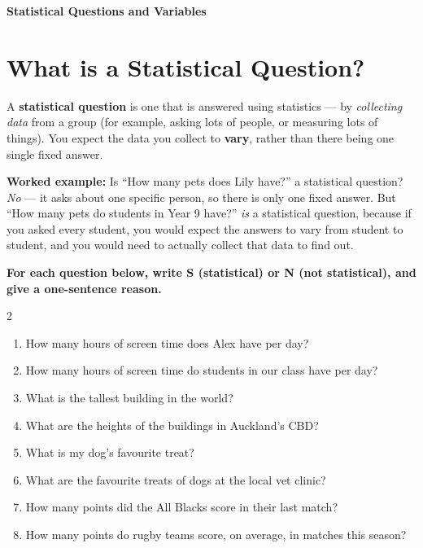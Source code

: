 \documentclass[11pt]{article}
\newcommand{\ans}{\hrulefill}
\newcommand{\anshere}{\par\vspace{0.4em}\noindent\ans\par\vspace{0.4em}}
\begin{document}
\thispagestyle{firstpage}

\begin{center}
  {\Large\bfseries Statistical Questions and Variables}
\end{center}
\vspace{0.3em}

\section{What is a Statistical Question?}

\noindent A \textbf{statistical question} is one that is answered using statistics --- by
\emph{collecting data} from a group (for example, asking lots of people, or measuring lots of
things). You expect the data you collect to \textbf{vary}, rather than there being one single
fixed answer.

\vspace{0.3em}
\noindent\textbf{Worked example:} Is ``How many pets does Lily have?'' a statistical question?
\emph{No} --- it asks about one specific person, so there is only one fixed answer. But ``How
many pets do students in Year 9 have?'' \emph{is} a statistical question, because if you asked
every student, you would expect the answers to vary from student to student, and you would need
to actually collect that data to find out.

\vspace{0.5em}
\noindent\textbf{For each question below, write S (statistical) or N (not statistical), and give
a one-sentence reason.}

\begin{multicols}{2}
\begin{enumerate}[label=(\alph*)]
  \item How many hours of screen time does Alex have per day?
  \anshere
  \item How many hours of screen time do students in our class have per day?
  \anshere
  \item What is the tallest building in the world?
  \anshere
  \item What are the heights of the buildings in Auckland's CBD?
  \anshere
  \item What is my dog's favourite treat?
  \anshere
  \item What are the favourite treats of dogs at the local vet clinic?
  \anshere
  \item How many points did the All Blacks score in their last match?
  \anshere
  \item How many points do rugby teams score, on average, in matches this season?
  \anshere
\end{enumerate}
\end{multicols}
\end{document}
